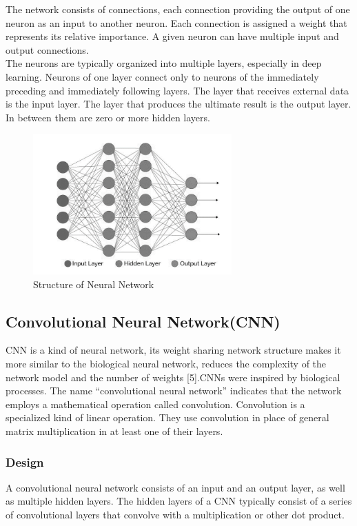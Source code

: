 The network consists of connections, each connection providing the output of one
neuron as an input to another neuron. Each connection is assigned a weight that
represents its relative importance. A given neuron can have multiple input and
output connections.\\
The neurons are typically organized into multiple layers, especially in deep
learning. Neurons of one layer connect only to neurons of the immediately
preceding and immediately following layers. The layer that receives external data
is the input layer. The layer that produces the ultimate result is the output layer. In
between them are zero or more hidden layers.

\begin{figure}[tbh] %
\begin{center}
	\includegraphics[width = 3in]{images/structure.png}
	\caption{Structure of Neural Network} %
	\label{figStructure of Neural Network} %
\end{center}
\end{figure}

\subsection{Convolutional Neural Network(CNN)}
CNN is a kind of neural network, its weight sharing network structure makes it more similar to the
biological neural network, reduces the complexity of the network model and the
number of weights [5].CNNs were inspired by biological processes. The name
“convolutional neural network” indicates that the network employs a
mathematical operation called convolution. Convolution is a specialized kind of
linear operation. They use convolution in place of general matrix multiplication in at least one of their layers.

\subsubsection{Design}
A convolutional neural network consists of an input and an output layer, as well as multiple hidden layers. The hidden layers of a CNN typically consist of a series of convolutional layers that convolve with a multiplication or other dot product.
\pagebreak

